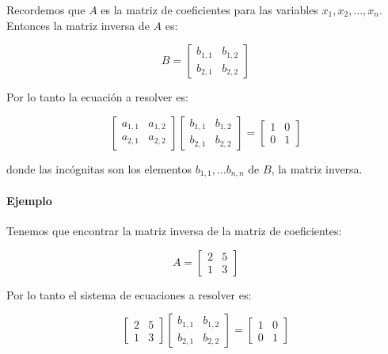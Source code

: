 \documentclass[
]{book}
\begin{document}
Recordemos que \(A\) es la matriz de coeficientes para las variables \(x_1, x_2, \dots, x_n\). Entonces la matriz inversa de \(A\) es:

\begin{equation}
B = \left[\begin{array}{ccc}
b_{1, 1} & b_{1, 2} \\
b_{2, 1} & b_{2, 2}
\end{array}
\right]
\end{equation}

Por lo tanto la ecuación a resolver es:

\begin{equation}
\left[\begin{array}{ccc}
a_{1, 1} & a_{1, 2} \\
a_{2, 1} & a_{2, 2}
\end{array}
\right]
\left[\begin{array}{ccc}
b_{1, 1} & b_{1, 2} \\
b_{2, 1} & b_{2, 2}
\end{array}
\right] =
\left[\begin{array}{ccc}
1 & 0 \\
0 & 1
\end{array}
\right]
\end{equation}

donde las incógnitas son los elementos \(b_{1,1}, \dots b_{n,n}\) de \(B\), la matriz inversa.

\hypertarget{ejemplo-1}{%
\paragraph{Ejemplo}\label{ejemplo-1}}

Tenemos que encontrar la matriz inversa de la matriz de coeficientes:

\begin{equation}
A =
\left[\begin{array}{ccc}
2 & 5 \\
1 & 3
\end{array}
\right]
\end{equation}

Por lo tanto el sistema de ecuaciones a resolver es:

\begin{equation}
\left[\begin{array}{ccc}
2 & 5 \\
1 & 3
\end{array}
\right]
\left[\begin{array}{ccc}
b_{1, 1} & b_{1, 2} \\
b_{2, 1} & b_{2, 2}
\end{array}
\right] =
\left[\begin{array}{ccc}
1 & 0 \\
0 & 1
\end{array}
\right]
\end{equation}
\end{document}
